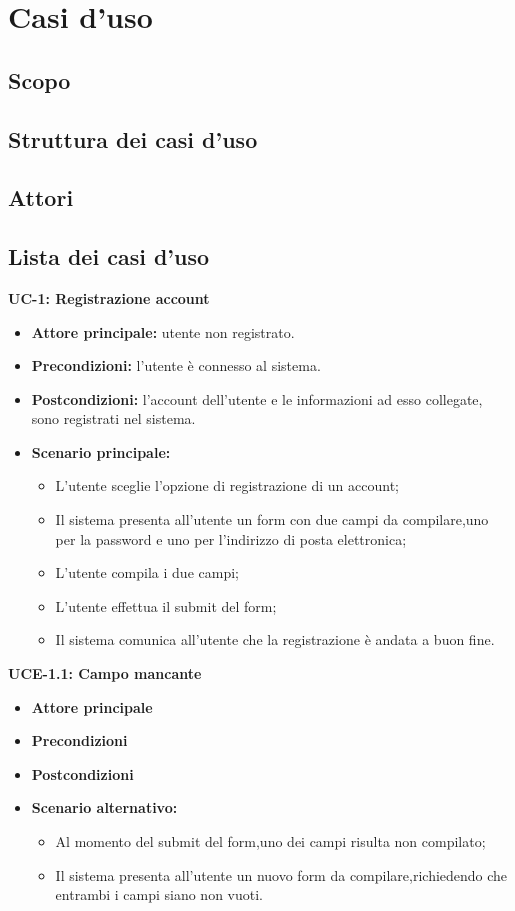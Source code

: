 \section{Casi d'uso}
\subsection{Scopo}
\subsection{Struttura dei casi d'uso}
\subsection{Attori}

\subsection{Lista dei casi d'uso}

\textbf{UC-1: Registrazione account}
\begin{itemize}
    \item \textbf{Attore principale: }utente non registrato.
    \item \textbf{Precondizioni: }l'utente è connesso al sistema.
    \item \textbf{Postcondizioni: }l'account dell'utente e le informazioni ad esso collegate, sono registrati nel sistema.
    \item \textbf{Scenario principale:} 
        \begin{itemize}
            \item L'utente sceglie l'opzione di registrazione di un account;
            \item Il sistema presenta all'utente un form con due campi da compilare,uno per la password
            e uno per l'indirizzo di posta elettronica;
            \item L'utente compila i due campi;
            \item L'utente effettua il submit del form;
            \item Il sistema comunica all'utente che la registrazione è andata 
            a buon fine.
        \end{itemize}
\end{itemize}

\textbf{UCE-1.1: Campo mancante}
\begin{itemize}
    \item \textbf{Attore principale}
    \item \textbf{Precondizioni}
    \item \textbf{Postcondizioni}
    \item \textbf{Scenario alternativo:}
    \begin{itemize}
        \item Al momento del submit del form,uno dei campi risulta non compilato;
        \item Il sistema presenta all'utente un nuovo form da compilare,richiedendo che 
        entrambi i campi siano non vuoti.
    \end{itemize}
\end{itemize}

